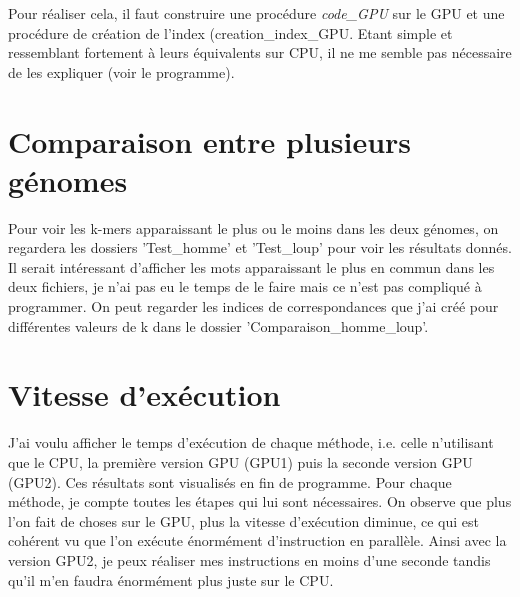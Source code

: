 \documentclass[10pt]{article}
\begin{document}
Pour réaliser cela, il faut construire une procédure \textit{code\_GPU} sur le GPU et une procédure de création de l'index (creation\_index\_GPU. Etant simple et ressemblant fortement à leurs équivalents sur CPU, il ne me semble pas nécessaire de les expliquer (voir le programme). \\


\section{Comparaison entre plusieurs génomes}


Pour voir les k-mers apparaissant le plus ou le moins dans les deux génomes, on regardera les dossiers 'Test\_homme' et 'Test\_loup' pour voir les résultats donnés. \\
Il serait intéressant d'afficher les mots apparaissant le plus en commun dans les deux fichiers, je n'ai pas eu le temps de le faire mais ce n'est pas compliqué à programmer. On peut regarder les indices de correspondances que j'ai créé pour différentes valeurs de k dans le dossier 'Comparaison\_homme\_loup'. \\


\section*{Vitesse d'exécution}


J'ai voulu afficher le temps d'exécution de chaque méthode, i.e. celle n'utilisant que le CPU, la première version GPU (GPU1) puis la seconde version GPU (GPU2). Ces résultats sont visualisés en fin de programme. Pour chaque méthode, je compte toutes les étapes qui lui sont nécessaires. On observe que plus l'on fait de choses sur le GPU, plus la vitesse d'exécution diminue, ce qui est cohérent vu que l'on exécute énormément d'instruction en parallèle. Ainsi avec la version GPU2, je peux réaliser mes instructions en moins d'une seconde tandis qu'il m'en faudra énormément plus juste sur le CPU.
\end{document}
